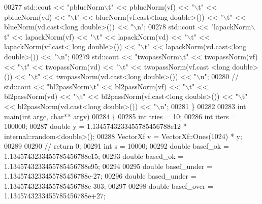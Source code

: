 \begin{DoxyCode}
00277   std::cout << \textcolor{stringliteral}{"pblueNorm\(\backslash\)t"}  << pblueNorm(vf)  << \textcolor{stringliteral}{"\(\backslash\)t"} << pblueNorm(vd)  << \textcolor{stringliteral}{"\(\backslash\)t"} << blueNorm(vf.cast<\textcolor{keywordtype}{long} \textcolor{keywordtype}{
      double}>()) << \textcolor{stringliteral}{"\(\backslash\)t"} << blueNorm(vd.cast<\textcolor{keywordtype}{long} \textcolor{keywordtype}{double}>()) << \textcolor{stringliteral}{"\(\backslash\)n"};
00278   std::cout << \textcolor{stringliteral}{"lapackNorm\(\backslash\)t"} << lapackNorm(vf) << \textcolor{stringliteral}{"\(\backslash\)t"} << lapackNorm(vd) << \textcolor{stringliteral}{"\(\backslash\)t"} << lapackNorm(vf.cast<\textcolor{keywordtype}{
      long} \textcolor{keywordtype}{double}>()) << \textcolor{stringliteral}{"\(\backslash\)t"} << lapackNorm(vd.cast<\textcolor{keywordtype}{long} \textcolor{keywordtype}{double}>()) << \textcolor{stringliteral}{"\(\backslash\)n"};
00279   std::cout << \textcolor{stringliteral}{"twopassNorm\(\backslash\)t"} << twopassNorm(vf) << \textcolor{stringliteral}{"\(\backslash\)t"} << twopassNorm(vd) << \textcolor{stringliteral}{"\(\backslash\)t"} << twopassNorm(vf.cast
      <\textcolor{keywordtype}{long} \textcolor{keywordtype}{double}>()) << \textcolor{stringliteral}{"\(\backslash\)t"} << twopassNorm(vd.cast<\textcolor{keywordtype}{long} \textcolor{keywordtype}{double}>()) << \textcolor{stringliteral}{"\(\backslash\)n"};
00280 \textcolor{comment}{//   std::cout << "bl2passNorm\(\backslash\)t" << bl2passNorm(vf) << "\(\backslash\)t" << bl2passNorm(vd) << "\(\backslash\)t" <<
       bl2passNorm(vf.cast<long double>()) << "\(\backslash\)t" << bl2passNorm(vd.cast<long double>()) << "\(\backslash\)n";}
00281 \}
00282 
00283 \textcolor{keywordtype}{int} main(\textcolor{keywordtype}{int} argc, \textcolor{keywordtype}{char}** argv)
00284 \{
00285   \textcolor{keywordtype}{int} tries = 10;
00286   \textcolor{keywordtype}{int} iters = 100000;
00287   \textcolor{keywordtype}{double} y = 1.1345743233455785456788e12 * internal::random<double>();
00288   VectorXf v = VectorXf::Ones(1024) * y;
00289 
00290 \textcolor{comment}{// return 0;}
00291   \textcolor{keywordtype}{int} s = 10000;
00292   \textcolor{keywordtype}{double} basef\_ok = 1.1345743233455785456788e15;
00293   \textcolor{keywordtype}{double} based\_ok = 1.1345743233455785456788e95;
00294 
00295   \textcolor{keywordtype}{double} basef\_under = 1.1345743233455785456788e-27;
00296   \textcolor{keywordtype}{double} based\_under = 1.1345743233455785456788e-303;
00297 
00298   \textcolor{keywordtype}{double} basef\_over = 1.1345743233455785456788e+27;

\end{DoxyCode}
